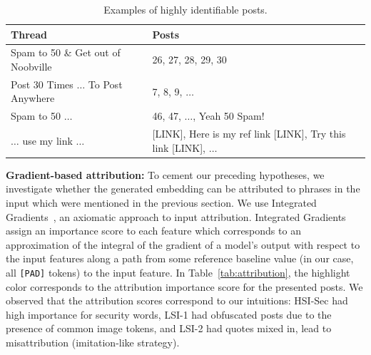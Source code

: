 \begin{table}
    \tiny
    \centering
    \begin{tabularx}{\linewidth}{XX}
    \toprule
        Thread & Posts  \\
    \midrule
         Spam to 50 \&  Get out of Noobville &  26, 27, 28, 29, 30 \\
         Post 30 Times $\dots$ To Post Anywhere& 7, 8, 9, $\dots$\\ 
         Spam to 50 $\dots$ & 46, 47, $\dots$, Yeah 50 Spam! \\
         $\dots$ use my link $\dots$ & {[LINK]}, Here is my ref link {[LINK]}, Try this link {[LINK]}, $\dots$\\
    \bottomrule
    \end{tabularx}
    \caption{Examples of highly identifiable posts.}
    \label{tab:example_posts}
\end{table}

\noindent \textbf{Gradient-based attribution:} To cement our preceding hypotheses, 
we investigate whether the generated embedding can be attributed to phrases in the input which were mentioned in the previous section. 
We use Integrated Gradients~\cite{sundararajan2017axiomatic}, an axiomatic approach to input attribution.
Integrated Gradients assign an importance score to each feature which corresponds to an approximation of the integral of the gradient of a model's output with respect to the input features along a path from some reference baseline value (in our case, all \texttt{[PAD]} tokens) to the  input feature.
In Table~\ref{tab:attribution}, the highlight color corresponds to the attribution importance score for the presented posts.
We observed that the attribution scores correspond to our intuitions: HSI-Sec had high importance for security words, LSI-1 had obfuscated posts due to the presence of common image tokens, and LSI-2 had quotes mixed in, lead to misattribution (imitation-like strategy).


